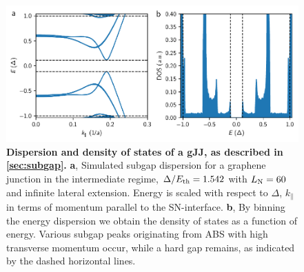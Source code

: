 \begin{figure}[]
	\centering
	\includegraphics[width=\linewidth]{chapter-gJJ/figs/si_subgap_dos}
	\caption{{\bf Dispersion and density of states of a gJJ, as described in \ref{sec:subgap}.}
		{\bf a}, Simulated subgap dispersion for a graphene junction in the intermediate regime, $\Delta/E_{\rm th}=1.542$ with $L_{\rm N}=60$ and infinite lateral extension.
		Energy is scaled with respect to $\Delta$, $k_\parallel$ in terms of momentum parallel to the SN-interface.
		{\bf b}, By binning the energy dispersion we obtain the density of states as a function of energy.
		Various subgap peaks originating from ABS with high transverse momentum occur, while a hard gap remains, as indicated by the dashed horizontal lines.
	}
	\label{fig:subgap_dos}
\end{figure}

